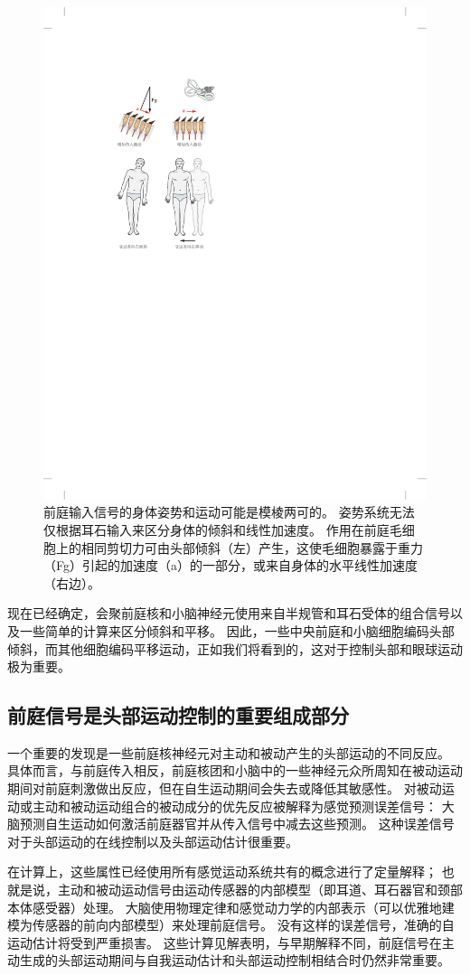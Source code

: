 \begin{figure}[htbp]
	\centering
	\includegraphics[width=0.5\linewidth]{chap27/fig_27_10}
	\caption{前庭输入信号的身体姿势和运动可能是模棱两可的。
		姿势系统无法仅根据耳石输入来区分身体的倾斜和线性加速度。
		作用在前庭毛细胞上的相同剪切力可由头部倾斜（左）产生，这使毛细胞暴露于重力（Fg）引起的加速度（a）的一部分，或来自身体的水平线性加速度（右边）。}
	\label{fig:27_10}
\end{figure}


现在已经确定，会聚前庭核和小脑神经元使用来自半规管和耳石受体的组合信号以及一些简单的计算来区分倾斜和平移。
因此，一些中央前庭和小脑细胞编码头部倾斜，而其他细胞编码平移运动，正如我们将看到的，这对于控制头部和眼球运动极为重要。



\subsection{前庭信号是头部运动控制的重要组成部分}

一个重要的发现是一些前庭核神经元对主动和被动产生的头部运动的不同反应。
具体而言，与前庭传入相反，前庭核团和小脑中的一些神经元众所周知在被动运动期间对前庭刺激做出反应，但在自生运动期间会失去或降低其敏感性。
对被动运动或主动和被动运动组合的被动成分的优先反应被解释为感觉预测误差信号：
大脑预测自生运动如何激活前庭器官并从传入信号中减去这些预测。
这种误差信号对于头部运动的在线控制以及头部运动估计很重要。


在计算上，这些属性已经使用所有感觉运动系统共有的概念进行了定量解释；
也就是说，主动和被动运动信号由运动传感器的内部模型（即耳道、耳石器官和颈部本体感受器）处理。
大脑使用物理定律和感觉动力学的内部表示（可以优雅地建模为传感器的前向内部模型）来处理前庭信号。
没有这样的误差信号，准确的自运动估计将受到严重损害。
这些计算见解表明，与早期解释不同，前庭信号在主动生成的头部运动期间与自我运动估计和头部运动控制相结合时仍然非常重要。



